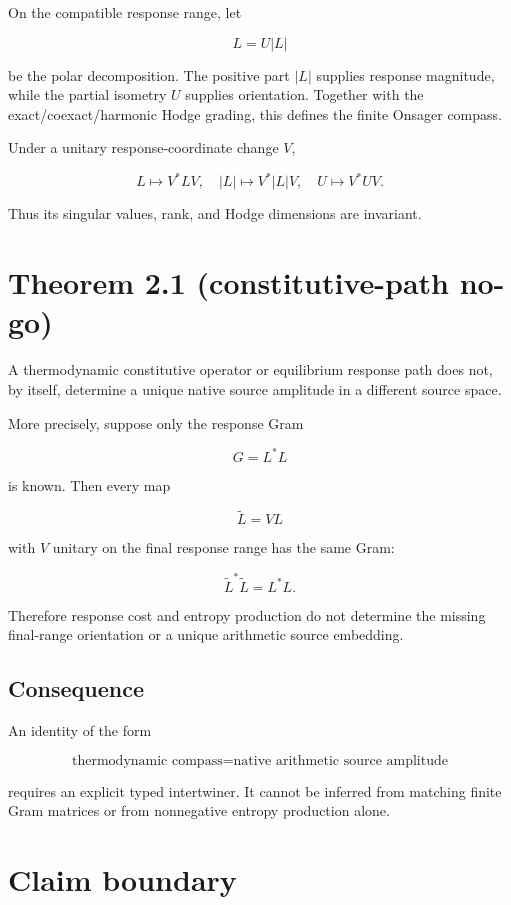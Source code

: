 On the compatible response range, let

\[
L=U|L|
\]

be the polar decomposition. The positive part \(|L|\) supplies response magnitude, while the partial isometry \(U\) supplies orientation. Together with the exact/coexact/harmonic Hodge grading, this defines the finite Onsager compass.

Under a unitary response-coordinate change \(V\),

\[
L\mapsto V^*LV,
\quad
|L|\mapsto V^*|L|V,
\quad
U\mapsto V^*UV.
\]

Thus its singular values, rank, and Hodge dimensions are invariant.

\hypertarget{theorem-2.1-constitutive-path-no-go}{%
\section{Theorem 2.1 (constitutive-path no-go)}\label{theorem-2.1-constitutive-path-no-go}}

A thermodynamic constitutive operator or equilibrium response path does not, by itself, determine a unique native source amplitude in a different source space.

More precisely, suppose only the response Gram

\[
G=L^*L
\]

is known. Then every map

\[
\widetilde L=VL
\]

with \(V\) unitary on the final response range has the same Gram:

\[
\widetilde L^*\widetilde L=L^*L.
\]

Therefore response cost and entropy production do not determine the missing final-range orientation or a unique arithmetic source embedding.

\hypertarget{consequence}{%
\subsection{Consequence}\label{consequence}}

An identity of the form

\[
\text{thermodynamic compass}
=\text{native arithmetic source amplitude}
\]

requires an explicit typed intertwiner. It cannot be inferred from matching finite Gram matrices or from nonnegative entropy production alone.

\hypertarget{claim-boundary}{%
\section{Claim boundary}\label{claim-boundary}}

